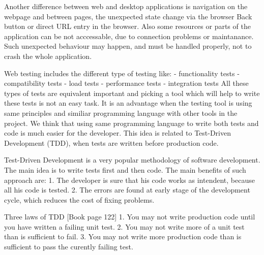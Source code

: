 		Another difference between web and desktop applications is
		navigation on the webpage and between pages, the unexpected state change via
		the browser Back button or direct URL entry in the browser. Also some
		resources or parts of the application can be not acccessable, due to
		connection problems or maintanance. Such unexpected behaviour may happen, and
		must be handled properly, not to crash the whole application.

		Web testing includes the different type of testing like:
			- functionality tests
			- compatibility tests
			- load tests
			- performance tests
			- integration tests
		All these types of tests are equivalent important and picking a tool which
		will help to write these tests is not an easy task. It is an advantage when
		the testing tool is using same principles and similiar programming language
		with other tools in the project. We think that using same programming language
		to write both tests and code is much easier for the developer. This idea is
		related to Test-Driven Development (TDD), when tests are written
		before production code.
		
		Test-Driven Development is a very popular methodology of software
			development. The main idea is to write tests first and then code. The main
			benefits of such approach are:
				1. The developer is sure that his code works as intendent, because all his
				code is tested.
				2. The errors are found at early stage of the development cycle, which
				reduces the cost of fixing problems.
			
			Three laws of TDD \cite[pp122]{Cleancode}[Book page 122]
				1. You may not write production code until you have written a failing unit
				test.
				2. You may not write more of a unit test than is sufficient to fail.
				3. You may not write more production code than is sufficient to pass the
				curently failing test.
			\iffalse	
					\subsection {Approaches in Web Testing}	
						\begin{textit}
							In this chapter I will explain
							what does testing actually meands. What types of testing exist: unit, integration, user-interface, regression,
						etc. What are the differences between these types of testing.
						
						Next I will prove why testing is so important in software development. Here I
						would like to mention some information about \textit{Quality control}. The
						idea is to show that testing increseases the speed of software development
						and also improves it's quality. So in terms of quality control testing will
						decrease the price and increase the value of the product for the end user.
						
						Also I want to mention other methodologies like \textit{Agile development},
						\textit{User experience design} and \textit{Test Driven Development}. And how
						testing can be used/integrated with these methodologies/processes.
						\end{textit}
			\fi